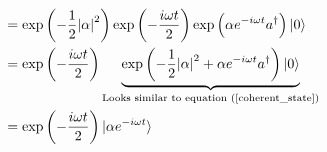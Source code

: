 \documentclass[a4paper,german,12pt,smallheadings]{scrartcl}
\begin{document}
\begin{enumerate}[a)]
\begin{align*}
      &= \exp\del{-\frac{1}{2}  \envert{\alpha}^2}  \exp\del{-\frac{i \omega t}{2}} \exp \del{\alpha e^{-i \omega t} a^\dagger} \ket{0} \\
      &= \exp\del{-\frac{i \omega t}{2}} \underbrace{\exp\del{-\frac{1}{2}  \envert{\alpha}^2  + \alpha e^{-i \omega t} a^\dagger} \ket{0}}_{\text{Looks similar to equation (\ref{coherent_state})}} \\
      &= \exp\del{-\frac{i \omega t}{2}} \ket{\alpha e^{-i \omega t}}
    \end{align*}



    

\end{enumerate}
\end{document}
